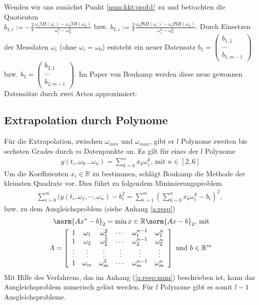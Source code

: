 Wenden wir uns zunächst Punkt \ref{num:kkt:prob1} zu und betrachten die Quotienten\\ $b_{1, i}:=-\frac{2}{\pi} \frac{\omega_i \Im{H(\omega_i)}-\omega_0 \Im{H(\omega_0)}}{\omega_i^2 - \omega^2_0}$ bzw. $b_{2, i}:=\frac{2}{\pi} \frac{\omega_0 \Re{H(\omega_i)} - \omega_0 \Re{H(\omega_0)}}{\omega_i^2 - \omega^2_0}$. Durch Einsetzen der Messdaten $\omega_i$ (ohne $\omega_i = \omega_0$) entsteht ein neuer Datensatz $b_1 = \left(\begin{array}{c}
b_{1,1} \\ 
\cdots \\ 
b_{1,m-1}
\end{array} \right)$ bzw. $b_2 = \left(\begin{array}{c}
b_{2,1} \\ 
\cdots \\ 
b_{2,m-1}
\end{array} \right)$. 
Im Paper \cite{Boukamp1993} von Boukamp werden diese neue gewonnen Datensätze durch zwei Arten approximiert:
\subsection{Extrapolation durch Polynome}
Für die Extrapolation, zwischen $\omega_{min}$ und $\omega_{max}$, gibt er $l$ Polynome zweiten bis sechsten Grades durch $m$ Datenpunkte an. Es gilt für eines der $l$ Polynome
\begin{align}
	y(t_i, \omega_0 ... \omega_n) = \sum_{k = 0}^{n} x_k \omega_{i}^{k} \text{, mit } n \in [2, 6]
\end{align}
Um die Koeffizienten $x_i \in \mathbb{R}$ zu bestimmen, schlägt Boukamp die Methode der kleinsten Quadrate vor. Dies führt zu folgendem Minimierungsproblem 
\begin{align}
	\sum_{i=0}^m (y(t_i, \omega_1, \cdots, \omega_n) - b_{i}^2 = \sum_{i=1}^m \left(\sum_{k = 0}^{n} x_k \omega_{i}^{k} - b_i \right)^2 \text{, }
\end{align}
bzw. zu dem Ausgleichsproblem (siehe Anhang \ref{a:resp})
\begin{align}
	\norm{Ax^* - b}_2 = \min{x \in \mathbb{R}} \norm{A x - b}_2 \text{, mit } \\
	A= \left[
		\begin{array}{cccccc}
		1 & \omega_1 & \omega_1^2 & \cdots & \omega_1^{n-1} & \omega_1^{n} \\ 
		1 & \omega_2 & \omega_2^2 & \cdots & \omega_2^{n-1} & \omega_2^{n} \\ 
		\vdots & \vdots & \vdots & \vdots & \vdots & \vdots \\ 
		1 & \omega_m & \omega_m^2 & \cdots & \omega_m^{n-1} & \omega_m^{n}
		\end{array} 
		\right] \text{ und } b \in \mathbb{R}^m
\end{align} 
Mit Hilfe des Verfahrens, das im Anhang (\ref{a:resp:num}) beschrieben ist, kann das Ausgleichsproblem numerisch gelöst werden. Für $l$ Polynome gibt es somit $l-1$ Ausgleichsprobleme.
